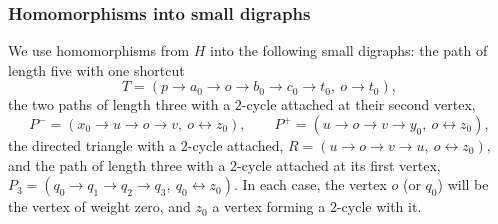 \subsubsection{Homomorphisms into small digraphs}
We use homomorphisms from $H$ into the following small digraphs: the path of length five with one shortcut
\[
 T=(p\to a_0\to o\to b_0\to c_0\to t_0,\ o\to t_0),
\]
the two paths of length three with a $2$-cycle attached at their second vertex,
\[
 P^-=(x_0\to u\to o\to v,\ o\leftrightarrow z_0),\qquad
 P^+=(u\to o\to v\to y_0,\ o\leftrightarrow z_0),
\]
the directed triangle with a $2$-cycle attached, $R=(u\to o\to v\to u,\ o\leftrightarrow z_0)$, and the path of length three with a $2$-cycle attached at its first vertex, $P_3=(q_0\to q_1\to q_2\to q_3,\ q_0\leftrightarrow z_0)$.
In each case, the vertex $o$ (or $q_0$) will be the vertex of weight zero, and $z_0$ a vertex forming a $2$-cycle with it.

